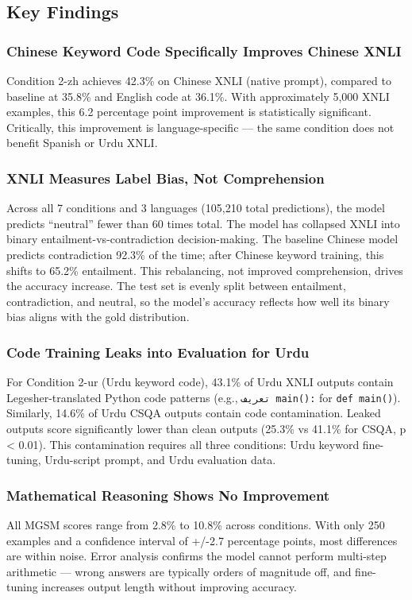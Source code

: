 \documentclass[conference]{IEEEtran}
\begin{document}
\subsection{Key Findings}

\subsubsection{Chinese Keyword Code Specifically Improves Chinese XNLI}
Condition 2-zh achieves 42.3\% on Chinese XNLI (native prompt), compared to baseline at 35.8\% and English code at 36.1\%. With approximately 5,000 XNLI examples, this 6.2 percentage point improvement is statistically significant. Critically, this improvement is language-specific — the same condition does not benefit Spanish or Urdu XNLI.

\subsubsection{XNLI Measures Label Bias, Not Comprehension}
Across all 7 conditions and 3 languages (105,210 total predictions), the model predicts ``neutral'' fewer than 60 times total. The model has collapsed XNLI into binary entailment-vs-contradiction decision-making. The baseline Chinese model predicts contradiction 92.3\% of the time; after Chinese keyword training, this shifts to 65.2\% entailment. This rebalancing, not improved comprehension, drives the accuracy increase. The test set is evenly split between entailment, contradiction, and neutral, so the model's accuracy reflects how well its binary bias aligns with the gold distribution.

\subsubsection{Code Training Leaks into Evaluation for Urdu}
For Condition 2-ur (Urdu keyword code), 43.1\% of Urdu XNLI outputs contain Legesher-translated Python code patterns (e.g., \texttt{تعریف main():} for \texttt{def main()}). Similarly, 14.6\% of Urdu CSQA outputs contain code contamination. Leaked outputs score significantly lower than clean outputs (25.3\% vs 41.1\% for CSQA, p < 0.01). This contamination requires all three conditions: Urdu keyword fine-tuning, Urdu-script prompt, and Urdu evaluation data.

\subsubsection{Mathematical Reasoning Shows No Improvement}
All MGSM scores range from 2.8\% to 10.8\% across conditions. With only 250 examples and a confidence interval of +/-2.7 percentage points, most differences are within noise. Error analysis confirms the model cannot perform multi-step arithmetic — wrong answers are typically orders of magnitude off, and fine-tuning increases output length without improving accuracy.
\end{document}

